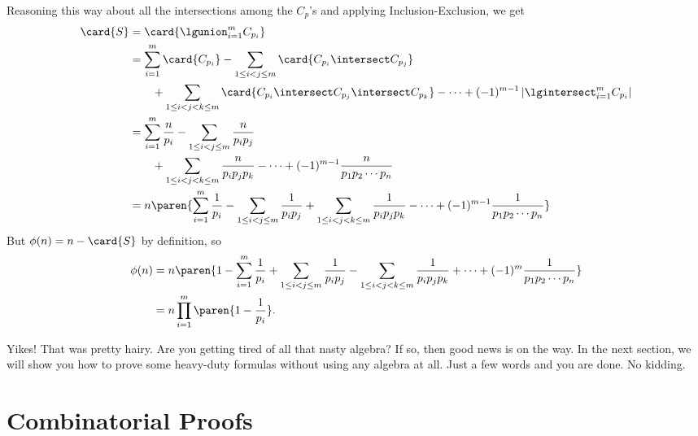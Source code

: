 Reasoning this way about all the intersections among the $C_p$'s and
applying Inclusion-Exclusion, we get
\begin{align*}
\card{S}
  & = \card{\lgunion_{i=1}^m C_{p_i}}\\
  & = \sum_{i=1}^m \card{C_{p_i}} - \sum_{1\leq i < j \leq m} \card{C_{p_i} \intersect C_{p_j}}\\
  &\qquad  + \sum_{1\leq i < j < k \leq m} \card{C_{p_i} \intersect C_{p_j} \intersect C_{p_k}} -
       \cdots + (-1)^{m-1} \left| \lgintersect_{i=1}^m C_{p_i}\right|\\
  & = \sum_{i=1}^m \frac{n}{p_i} -
      \sum_{1\leq i < j \leq m} \frac{n}{p_ip_j}\\
  &\qquad  + \sum_{1\leq i < j < k \leq m} \frac{n}{p_ip_jp_k} -
       \cdots + (-1)^{m-1} \frac{n}{p_1p_2\cdots p_n}\\
  & = n\paren{\sum_{i=1}^m \frac{1}{p_i} -
      \sum_{1\leq i < j \leq m} \frac{1}{p_ip_j}
       + \sum_{1\leq i < j < k \leq m} \frac{1}{p_ip_jp_k} - \cdots
        + (-1)^{m-1} \frac{1}{p_1p_2\cdots p_n}}
\end{align*}
But $\phi(n)=n-\card{S}$ by definition, so
\begin{align}
  \phi(n) & = n\paren{1 - \sum_{i=1}^m \frac{1}{p_i} +  \sum_{1\leq i < j \leq m} \frac{1}{p_ip_j}
    - \sum_{1\leq i < j < k \leq m} \frac{1}{p_ip_jp_k} + \cdots
    + (-1)^m\frac{1}{p_1p_2\cdots p_n}}\notag\\
          &  = n \prod_{i=1}^m \paren{1 - \frac{1}{p_i}}.\label{inex-phi}
\end{align}

Yikes!  That was pretty hairy.  Are you getting tired of all that
nasty algebra?  If so, then good news is on the way.  In the next
section, we will show you how to prove some heavy-duty formulas
without using any algebra at all.  Just a few words and you are done.
No kidding.

\begin{problems}
\practiceproblems
{}

\classproblems
{}

\homeworkproblems
{}

\end{problems}


\section{Combinatorial Proofs}\label{combinatorial_proof_sec}

